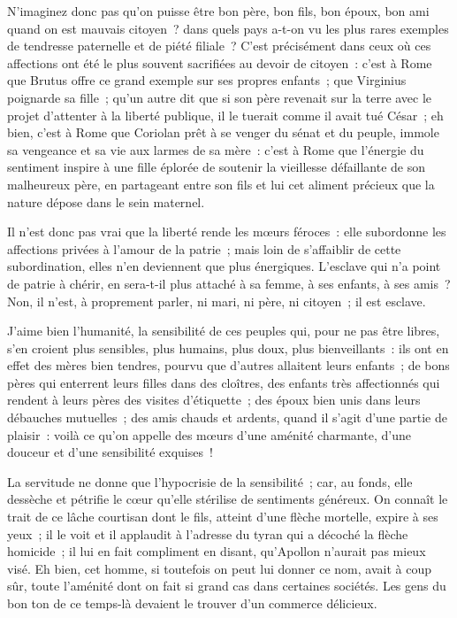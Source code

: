 \documentclass[french,twoside]{book} %
\begin{document}
N’imaginez donc pas qu’on puisse être bon père, bon fils, bon époux, bon ami quand on est mauvais citoyen ? dans quels pays a-t-on vu les plus rares exemples de tendresse paternelle et de piété filiale ? C’est précisément dans ceux où ces affections ont été le plus souvent sacrifiées au devoir de citoyen : c’est à Rome que Brutus offre ce grand exemple sur ses propres enfants ; que Virginius poignarde sa fille ; qu’un autre dit que si son père revenait sur la terre avec le projet d’attenter à la liberté publique, il le tuerait comme il avait tué César ; eh bien, c’est à Rome que Coriolan prêt à se venger du sénat et du peuple, immole sa vengeance et sa vie aux larmes de sa mère : c’est à Rome que l’énergie du sentiment inspire à une fille éplorée de soutenir la vieillesse défaillante de son malheureux père, en partageant entre son fils et lui cet aliment précieux que la nature dépose dans le sein maternel.\par
Il n’est donc pas vrai que la liberté rende les mœurs féroces : elle subordonne les affections privées à l’amour de la patrie ; mais loin de s’affaiblir de cette subordination, elles n’en deviennent que plus énergiques. L’esclave qui n’a point de patrie à chérir, en sera-t-il plus attaché à sa femme, à ses enfants, à ses amis ? Non, il n’est, à proprement parler, ni mari, ni père, ni citoyen ; il est esclave.\par
J’aime bien l’humanité, la sensibilité de ces peuples qui, pour ne pas être libres, s’en croient plus sensibles, plus humains, plus doux, plus bienveillants : ils ont en effet des mères bien tendres, pourvu que d’autres allaitent leurs enfants ; de bons pères qui enterrent leurs filles dans des cloîtres, des enfants très affectionnés qui rendent à leurs pères des visites d’étiquette ; des époux bien unis dans leurs débauches mutuelles ; des amis chauds et ardents, quand il s’agit d’une partie de plaisir : voilà ce qu’on appelle des mœurs d’une aménité charmante, d’une douceur et d’une sensibilité exquises !\par
La servitude ne donne que l’hypocrisie de la sensibilité ; car, au fonds, elle dessèche et pétrifie le cœur qu’elle stérilise de sentiments généreux. On connaît le trait de ce lâche courtisan dont le fils, atteint d’une flèche mortelle, expire à ses yeux ; il le voit et il applaudit à l’adresse du tyran qui a décoché la flèche homicide ; il lui en fait compliment en disant, qu’Apollon n’aurait pas mieux visé. Eh bien, cet homme, si toutefois on peut lui donner ce nom, avait à coup sûr, toute l’aménité dont on fait si grand cas dans certaines sociétés. Les gens du bon ton de ce temps-là devaient le trouver d’un commerce délicieux.\par
\end{document}
